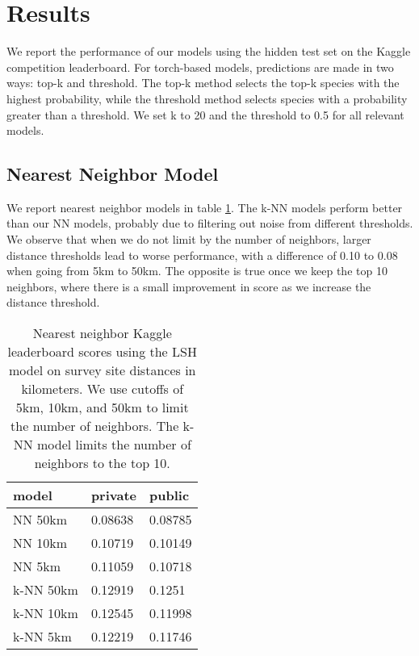 \section{Results}

We report the performance of our models using the hidden test set on the Kaggle competition leaderboard.
For torch-based models, predictions are made in two ways: top-k and threshold.
The top-k method selects the top-k species with the highest probability, while the threshold method selects species with a probability greater than a threshold.
We set k to 20 and the threshold to 0.5 for all relevant models.

\subsection{Nearest Neighbor Model}

We report nearest neighbor models in table \ref{tab:nn}.
The k-NN models perform better than our NN models, probably due to filtering out noise from different thresholds.
We observe that when we do not limit by the number of neighbors, larger distance thresholds lead to worse performance, with a difference of 0.10 to 0.08 when going from 5km to 50km.
The opposite is true once we keep the top 10 neighbors, where there is a small improvement in score as we increase the distance threshold.

\begin{table}[h]
    \caption{
        Nearest neighbor Kaggle leaderboard scores using the LSH model on survey site distances in kilometers.
        We use cutoffs of 5km, 10km, and 50km to limit the number of neighbors.
        The k-NN model limits the number of neighbors to the top 10.
    }
    \label{tab:nn}
    \begin{tabular}{|l|l|l|}
    \hline
    \textbf{model} & \textbf{private} & \textbf{public} \\ \hline
    NN 50km         & 0.08638          & 0.08785         \\ \hline
    NN 10km         & 0.10719          & 0.10149         \\ \hline
    NN 5km          & 0.11059          & 0.10718         \\ \hline
    k-NN 50km        & 0.12919          & 0.1251          \\ \hline
    k-NN 10km        & 0.12545          & 0.11998         \\ \hline
    k-NN 5km         & 0.12219          & 0.11746         \\ \hline
    \end{tabular}%
\end{table}

